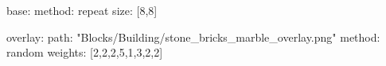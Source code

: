 base:
  method: repeat
  size: [8,8]

overlay:
  path: "Blocks/Building/stone_bricks_marble_overlay.png"
  method: random
  weights: [2,2,2,5,1,3,2,2]